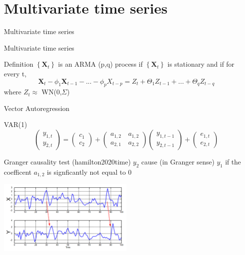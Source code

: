 \documentclass[11pt]{beamer}
\begin{document}
\section{Multivariate time series}
\begin{frame}
\begin{center}
\Huge
Multivariate time series
\end{center}
\end{frame}

\begin{frame}{Multivariate time series \cite{brockwell2002introduction}}
\begin{alertblock}{Definition}
$\left\lbrace \textbf{X}_{t} \right\rbrace$ is an ARMA (p,q) process if $\left\lbrace \textbf{X}_{t} \right\rbrace$ is stationary and if for every t, 
\begin{equation*}
\bm{X}_{t}-\phi_{1}\bm{X}_{t-1}-...-\phi_{p}X_{t-p}=Z_{t}+\Theta_{1}Z_{t-1}+...+\Theta_{q}Z_{t-q}
\end{equation*}
where $Z_{t}\approx$ WN(0,$\Sigma$)
\end{alertblock}
\end{frame}

\begin{frame}{Vector Autoregression \cite{hamilton2020time}}
\begin{alertblock}{VAR(1)}
\begin{equation*}
\begin{pmatrix} y_{1,t} \\ y_{2,t} \end{pmatrix} = \begin{pmatrix} c_{1} \\ c_{2} \end{pmatrix} + \begin{pmatrix} a_{1,2}\quad a_{1,2} \\ a_{2,1} \quad a_{2,2} \end{pmatrix} \begin{pmatrix} y_{1,t-1} \\ y_{2,t-1} \end{pmatrix} +
\begin{pmatrix} e_{1,t} \\ e_{2,t} \end{pmatrix}
\end{equation*}
\end{alertblock}

\begin{alertblock}{Granger causality test (hamilton2020time)}
$y_{2}$ cause (in Granger sense) $y_{1}$ if the coefficent $a_{1,2}$ is signficantly not equal to 0
\begin{center}
     \includegraphics[width=0.5\textwidth]{Pic/granger.png}
    \end{center}
    \end{alertblock}
\end{frame}
\end{document}
